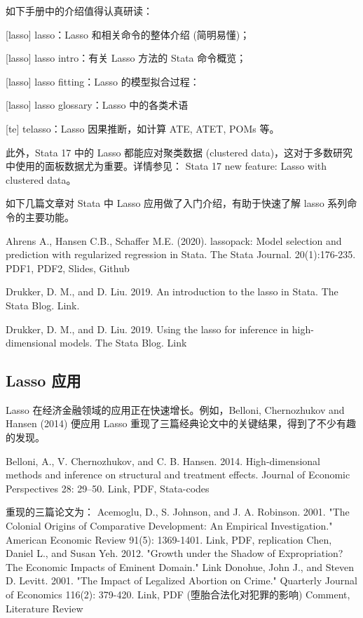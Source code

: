{\noindent
如下手册中的介绍值得认真研读：


[lasso] lasso：Lasso 和相关命令的整体介绍 (简明易懂)；

[lasso] lasso intro：有关 Lasso 方法的 Stata 命令概览；  

[lasso] lasso fitting：Lasso 的模型拟合过程：

[lasso] lasso glossary：Lasso 中的各类术语 

[te] telasso：Lasso 因果推断，如计算 ATE, ATET, POMs 等。


此外，Stata 17 中的 Lasso 都能应对聚类数据 (clustered data)，这对于多数研究中使用的面板数据尤为重要。详情参见： Stata 17 new feature: Lasso with clustered data。


如下几篇文章对 Stata 中 Lasso 应用做了入门介绍，有助于快速了解 lasso 系列命令的主要功能。

Ahrens A., Hansen C.B., Schaffer M.E. (2020). lassopack: Model selection and prediction with regularized regression in Stata. The Stata Journal. 20(1):176-235. PDF1, PDF2, Slides, Github

Drukker, D. M., and D. Liu. 2019. An introduction to the lasso in Stata. The Stata Blog.
Link.

Drukker, D. M., and D. Liu. 2019. Using the lasso for inference in high-dimensional models. The Stata Blog.
Link




\subsection{Lasso 应用}

Lasso 在经济金融领域的应用正在快速增长。例如，Belloni, Chernozhukov and Hansen (2014) 便应用 Lasso 重现了三篇经典论文中的关键结果，得到了不少有趣的发现。

Belloni, A., V. Chernozhukov, and C. B. Hansen. 2014. 
High-dimensional methods and inference on structural and treatment effects. 
Journal of Economic Perspectives 28: 29–50. Link, PDF, Stata-codes


重现的三篇论文为：
Acemoglu, D., S. Johnson, and J. A. Robinson. 2001. "The Colonial Origins of Comparative Development: An Empirical Investigation." American Economic Review 91(5): 1369-1401. Link,  PDF, replication
Chen, Daniel L., and Susan Yeh. 2012. "Growth under the Shadow of Expropriation? The Economic Impacts of Eminent Domain." Link
Donohue, John J., and Steven D. Levitt. 2001. "The Impact of Legalized Abortion on Crime." Quarterly Journal of Economics 116(2): 379-420. Link, PDF (堕胎合法化对犯罪的影响)
Comment, Literature Review



}
